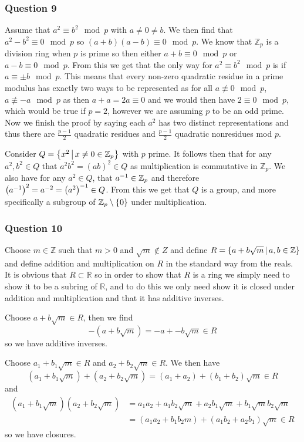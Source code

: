 \documentclass{article}
\begin{document}
\subsubsection{Question 9}
Assume that $a^2 \equiv b^2 \mod p$ with $a\not=0\not=b$. We then find that $a^2-b^2\equiv 0\mod p$ so $(a+b)(a-b)\equiv0\mod p$. We know that $\mathbb Z_p$ is a division ring when $p$ is prime so then either $a+b\equiv 0\mod p$ or $a-b\equiv 0\mod p$. From this we get that the only way for $a^2 \equiv b^2\mod p$ is if $a\equiv \pm b\mod p$. This means that every non-zero quadratic residue in a prime modulus has exactly two ways to be represented as for all $a\not\equiv0\mod p$, $a\not\equiv -a\mod p$ as then $a+a = 2a \equiv 0$ and we would then have $2\equiv 0\mod p$, which would be true if $p=2$, however we are assuming $p$ to be an odd prime. Now we finish the proof by saying each $a^2$ has two distinct representations and thus there are $\frac{p-1}2$ quadratic residues and $\frac{p-1}2$ quadratic nonresidues mod $p$.

Consider $Q = \left\{{x^2} \,\middle|\, {x\not=0\in\mathbb Z_p}\right\}$ with $p$ prime. It follows then that for any $a^2,b^2 \in Q$ that $a^2b^2 = (ab)^2\in Q$ as multiplication is commutative in $\mathbb Z_p$. We also have for any $a^2 \in Q$, that ${a}^{-1}\in \mathbb Z_p$ and therefore $\left({a}^{-1}\right)^2 = a^{-2} = {\left(a^2\right)}^{-1} \in Q$. From this we get that $Q$ is a group, and more specifically a subgroup of $\mathbb Z_p\setminus\left\{ {0} \right\}$ under multiplication. 

\subsubsection{Question 10}

Choose $m \in \mathbb Z$ such that $m > 0$ and $\sqrt m \not\in Z$ and define $R = \left\{{a+b\sqrt m} \,\middle|\, {a,b\in \mathbb Z}\right\}$ and define addition and multiplication on $R$ in the standard way from the reals. It is obvious that $R\subset \mathbb R$ so in order to show that $R$ is a ring we simply need to show it to be a subring of $\mathbb R$, and to do this we only need show it is closed under addition and multiplication and that it has additive inverses.

Choose $a+b\sqrt m \in R$, then we find $$-\left(a+b\sqrt m\right) = -a+-b\sqrt m \in R$$ so we have additive inverses.

Choose $a_1+b_1\sqrt m \in R$ and $a_2+b_2\sqrt m \in R$. We then have $$\left(a_1+b_1\sqrt m\right)+\left(a_2+b_2\sqrt m\right) = (a_1+a_2)+(b_1+b_2)\sqrt m \in R$$ and \begin{align*}
\left(a_1+b_1\sqrt m\right)\left(a_2+b_2\sqrt m\right) &= a_1a_2+a_1b_2\sqrt m + a_2b_1\sqrt m+b_1\sqrt mb_2\sqrt m \\
&= (a_1a_2 + b_1b_2m) + (a_1b_2+a_2b_1)\sqrt m \in R
\end{align*}
so we have closures.
\end{document}
